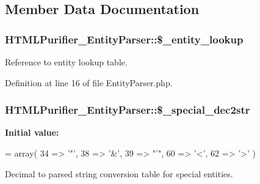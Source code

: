 \subsection{Member Data Documentation}
\hypertarget{classHTMLPurifier__EntityParser_a4c4b9d2b462fea1c7d027f009dabf4aa}{
\subsubsection[{\$\+\_\+entity\+\_\+lookup}]{\setlength{\rightskip}{0pt plus 5cm}H\+T\+M\+L\+Purifier\+\_\+\+Entity\+Parser\+::\$\+\_\+entity\+\_\+lookup\hspace{0.3cm}{\ttfamily [protected]}}}\label{classHTMLPurifier__EntityParser_a4c4b9d2b462fea1c7d027f009dabf4aa}
Reference to entity lookup table. 

Definition at line 16 of file Entity\+Parser.\+php.

\hypertarget{classHTMLPurifier__EntityParser_a0144a916f272789e64e2bd514139b31e}{
\subsubsection[{\$\+\_\+special\+\_\+dec2str}]{\setlength{\rightskip}{0pt plus 5cm}H\+T\+M\+L\+Purifier\+\_\+\+Entity\+Parser\+::\$\+\_\+special\+\_\+dec2str\hspace{0.3cm}{\ttfamily [protected]}}}\label{classHTMLPurifier__EntityParser_a0144a916f272789e64e2bd514139b31e}
{\bfseries Initial value\+:}
\begin{DoxyCode}
=
            array(
                    34 => \textcolor{charliteral}{'"'},
                    38 => \textcolor{charliteral}{'&'},
                    39 => \textcolor{stringliteral}{"'"},
                    60 => \textcolor{charliteral}{'<'},
                    62 => \textcolor{charliteral}{'>'}
            )
\end{DoxyCode}
Decimal to parsed string conversion table for special entities. 

